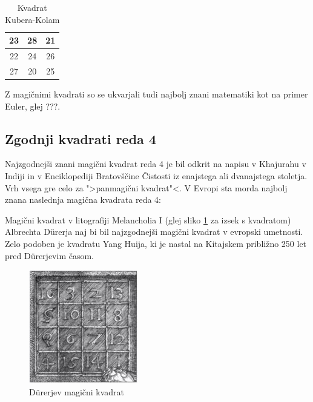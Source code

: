 \documentclass[a4paper,12pt]{article}
\theoremstyle{definition}
\begin{document}
\begin{table}[h!]
   \centering
   \caption{Kvadrat Kubera-Kolam}
   \label{kubera}
   \begin{tabular}{|c|c|c|}
      \hline
      23 & 28 & 21 \\ \hline
      22 & 24 & 26 \\ \hline
      27 & 20 & 25 \\ \hline
   \end{tabular}
\end{table}

      Z magičnimi kvadrati so se ukvarjali tudi najbolj znani matematiki kot na
primer Euler, glej ???. %


\subsection{Zgodnji kvadrati reda 4}

Najzgodnejši znani magični kvadrat reda 4 je bil odkrit na napisu
v Khajurahu v Indiji in v Enciklopediji Bratovščine Čistosti iz enajstega
ali dvanajstega stoletja. Vrh vsega gre celo za ">panmagični kvadrat"<.
V Evropi sta morda najbolj znana naslednja magična kvadrata reda 4:

Magični kvadrat v litografiji Melancholia I (glej sliko \ref{fig:durer}
za izsek s kvadratom) Albrechta Dürerja naj bi bil najzgodnejši magični kvadrat
v evropski umetnosti. Zelo podoben je kvadratu Yang Huija, ki je nastal na Kitajskem
približno 250 let pred Dürerjevim časom.

   
\begin{figure}[h!]
   \centering
   \caption{Dürerjev magični kvadrat}
   \label{fig:durer}
   \includegraphics[scale=1.5]{durer.png}
\end{figure}
\end{document}
